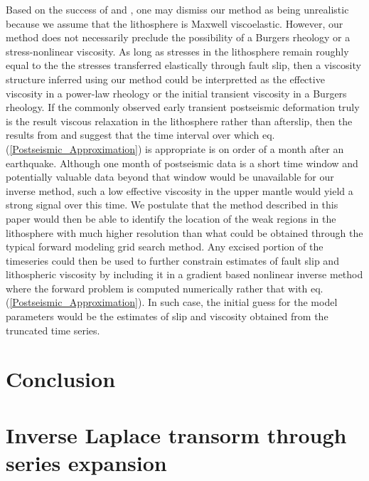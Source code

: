 \documentclass[extra]{gji}
\begin{document}
Based on the success of \citet{P2003,P2005} and \citet{F2006b}, one
may dismiss our method as being unrealistic because we assume that the
lithosphere is Maxwell viscoelastic.  However, our method does not
necessarily preclude the possibility of a Burgers rheology or a
stress-nonlinear viscosity.  As long as stresses in the lithosphere
remain roughly equal to the the stresses transferred elastically
through fault slip, then a viscosity structure inferred using our
method could be interpretted as the effective viscosity in a power-law
rheology or the initial transient viscosity in a Burgers rheology.  If
the commonly observed early transient postseismic deformation truly is
the result viscous relaxation in the lithosphere rather than afterslip,
then the results from \citet{P2003,P2005} and \citet{F2006b} suggest
that the time interval over which
eq. (\ref{Postseismic_Approximation}) is appropriate is on order of a
month after an earthquake.  Although one month of postseismic data is
a short time window and potentially valuable data beyond that window
would be unavailable for our inverse method, such a low
effective viscosity in the upper mantle would yield a strong signal
over this time.  We postulate that the method described in this paper
would then be able to identify the location of the weak regions in the
lithosphere with much higher resolution than what could be obtained
through the typical forward modeling grid search method.  Any excised
portion of the timeseries could then be used to further constrain
estimates of fault slip and lithospheric viscosity by including it in
a gradient based nonlinear inverse method where the forward problem is
computed numerically rather that with
eq. (\ref{Postseismic_Approximation}). In such case, the initial guess
for the model parameters would be the estimates of slip and viscosity
obtained from the truncated time series.  




\section{Conclusion}

\appendix
\section{Inverse Laplace transorm through series expansion}
\end{document}
